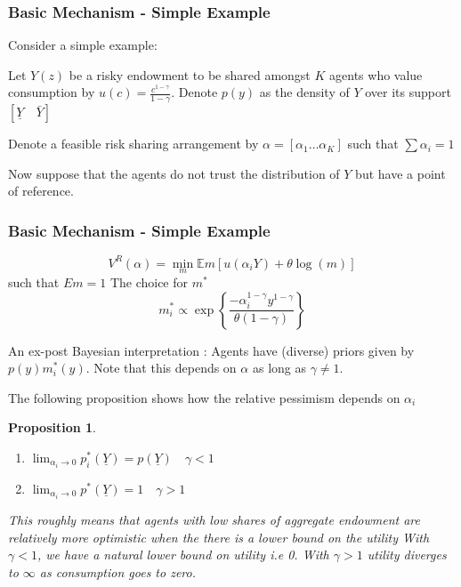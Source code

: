 \documentclass{beamer}
\newtheorem{proposition}{Proposition}
\begin{document}
\begin{frame}
\frametitle{Basic Mechanism - Simple Example}

Consider a simple example:




\noindent Let $Y(z)$ be a risky endowment to be shared amongst $K$ agents who value consumption by $u(c)=\frac{c^{1-\gamma}}{1-\gamma}$. Denote $p(y)$ as the density of $Y$ over its support $[\underline{Y} \quad \bar{Y}]$




Denote a feasible risk sharing arrangement by $\alpha = [\alpha_1 \dots \alpha_K]$ such that $\sum \alpha_i=1$




Now suppose that the agents do not trust the distribution of $Y$ but
have a point of reference. 



\end{frame}




\begin{frame}
\frametitle{Basic Mechanism - Simple Example}
\[V^R (\alpha)=\min_{m}\mathbb{E}m[u(\alpha_iY)+\theta\log(m)]\]
such that 
$Em=1$
 The choice for $m^*$
\[m_i^*\propto \exp\left\{\frac {-\alpha^{1-\gamma}_iy^{1-\gamma}}{\theta(1-\gamma)}\right\}\]

An ex-post Bayesian interpretation : Agents have (diverse) priors given by $p(y)m^*_i(y)$. Note that this depends on $\alpha$ as long as $\gamma \neq 1$.

\end{frame}

\begin{frame}
The following proposition shows how the relative pessimism depends on $\alpha_i$
\begin{proposition}
\label{propo-1}
\begin{enumerate}
	\item $\lim_{\alpha_i \to 0} p_i^*(\underline{Y})=p(\underline{Y}) \quad \gamma < 1$
	\item $\lim_{\alpha_i \to 0} p^*(\underline{Y})=1  \quad \gamma > 1$
\end{enumerate}
\end{proposition}
\emph{This roughly means that agents with low shares of aggregate endowment are relatively more optimistic when the there is a lower bound on the utility  With $\gamma < 1$, we have a natural lower bound on utility i.e 0. With $\gamma > 1$ utility diverges to $\infty$ as consumption goes to zero.}
\end{frame}
\end{document}
